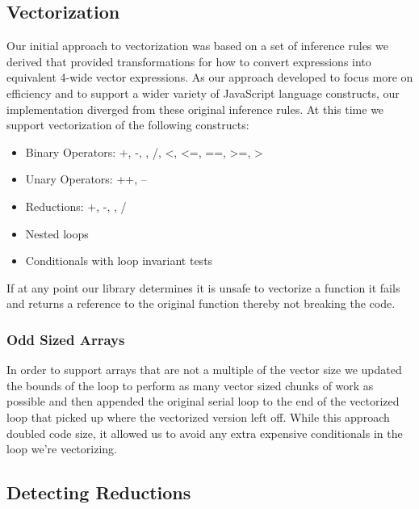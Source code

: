 \documentclass[conference]{IEEEtran}
\begin{document}
\subsection{Vectorization}
Our initial approach to vectorization was based on a set of inference rules we
derived that provided transformations for how to convert expressions into
equivalent 4-wide vector expressions. As our approach developed to focus more
on efficiency and to support a wider variety of JavaScript language constructs,
our implementation diverged from these original inference rules. At this time
we support vectorization of the following constructs:
\begin{itemize}
\item Binary Operators: +, -, \*, /, <, <=, ==, >=, >
\item Unary Operators: ++, --
\item Reductions: +, -, \*, /
\item Nested loops
\item Conditionals with loop invariant tests
\end{itemize}
If at any point our library determines it is unsafe to vectorize a function it
fails and returns a reference to the original function thereby not breaking the
code.

\subsubsection{Odd Sized Arrays}
In order to support arrays that are not a multiple of the vector size we
updated the bounds of the loop to perform as many vector sized chunks of work
as possible and then appended the original serial loop to the end of the
vectorized loop that picked up where the vectorized version left off. While
this approach doubled code size, it allowed us to avoid any extra expensive
conditionals in the loop we're vectorizing.


\subsection{Detecting Reductions}
\end{document}
